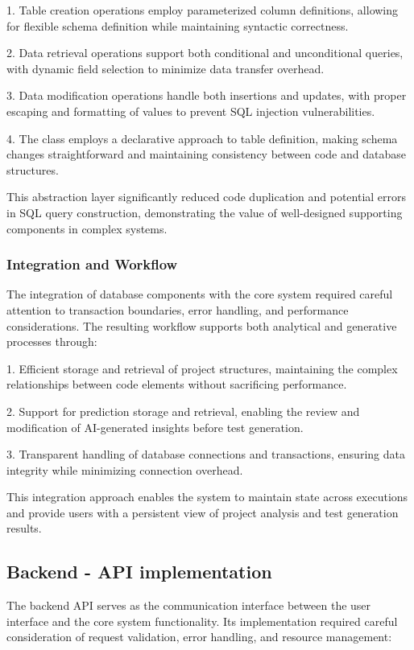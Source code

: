 1. Table creation operations employ parameterized column definitions, allowing for flexible schema definition while maintaining syntactic correctness.

2. Data retrieval operations support both conditional and unconditional queries, with dynamic field selection to minimize data transfer overhead.

3. Data modification operations handle both insertions and updates, with proper escaping and formatting of values to prevent SQL injection vulnerabilities.

4. The class employs a declarative approach to table definition, making schema changes straightforward and maintaining consistency between code and database structures.

This abstraction layer significantly reduced code duplication and potential errors in SQL query construction, demonstrating the value of well-designed supporting components in complex systems.

\subsubsection{Integration and Workflow}

The integration of database components with the core system required careful attention to transaction boundaries, error handling, and performance considerations. The resulting workflow supports both analytical and generative processes through:

1. Efficient storage and retrieval of project structures, maintaining the complex relationships between code elements without sacrificing performance.

2. Support for prediction storage and retrieval, enabling the review and modification of AI-generated insights before test generation.

3. Transparent handling of database connections and transactions, ensuring data integrity while minimizing connection overhead.

This integration approach enables the system to maintain state across executions and provide users with a persistent view of project analysis and test generation results.

\subsection{Backend - API implementation}

The backend API serves as the communication interface between the user interface and the core system functionality. Its implementation required careful consideration of request validation, error handling, and resource management:

